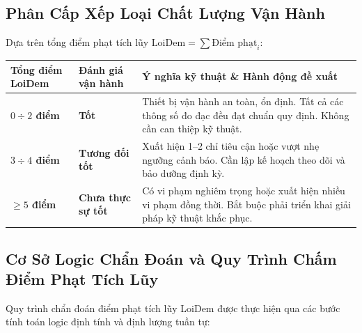\documentclass[12pt,a4paper]{article}
\begin{document}
\subsection{Phân Cấp Xếp Loại Chất Lượng Vận Hành}

Dựa trên tổng điểm phạt tích lũy $\mathrm{LoiDem} = \sum \text{Điểm phạt}_i$:

\begin{table}[htbp]
\centering
\begin{tabularx}{\textwidth}{>{\centering\arraybackslash}p{2.8cm}
                              >{\centering\arraybackslash}p{3.5cm}Y}
\toprule
{}
\color{white}\textbf{Tổng điểm LoiDem} & \color{white}\textbf{Đánh giá vận hành} &
\color{white}\textbf{Ý nghĩa kỹ thuật \& Hành động đề xuất} \\
\midrule
\textbf{$0\div2$ điểm} & \textbf{\color{darkgreen}Tốt} & Thiết bị vận hành an toàn, ổn định. Tất cả các thông số đo đạc đều đạt chuẩn quy định. Không cần can thiệp kỹ thuật. \\
\textbf{$3\div4$ điểm} & \textbf{\color{warningyellow}Tương đối tốt} & Xuất hiện 1--2 chỉ tiêu cận hoặc vượt nhẹ ngưỡng cảnh báo. Cần lập kế hoạch theo dõi và bảo dưỡng định kỳ. \\
\textbf{$\ge5$ điểm} & \textbf{\color{accent}Chưa thực sự tốt} & Có vi phạm nghiêm trọng hoặc xuất hiện nhiều vi phạm đồng thời. Bắt buộc phải triển khai giải pháp kỹ thuật khắc phục. \\
\bottomrule
\end{tabularx}
\end{table}

\subsection{Cơ Sở Logic Chẩn Đoán và Quy Trình Chấm Điểm Phạt Tích Lũy}

Quy trình chẩn đoán điểm phạt tích lũy LoiDem được thực hiện qua các bước tính toán logic định tính và định lượng tuần tự:
\end{document}
